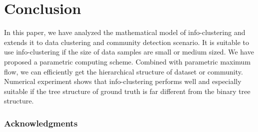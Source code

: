 \documentclass{article}
\begin{document}
\section{Conclusion}\label{sec:conclusion}
In this paper, we have analyzed the mathematical model of info-clustering and extends it to data clustering and community detection scenario. It is suitable to use info-clustering if the size of data samples are small or medium sized. We have proposed a parametric computing scheme. Combined with parametric maximum flow, we can efficiently get the hierarchical structure of dataset or community. Numerical experiment shows that info-clustering performs well and especially suitable if the tree structure of ground truth is far different from the binary tree structure.

\subsubsection*{Acknowledgments}





\end{document}

